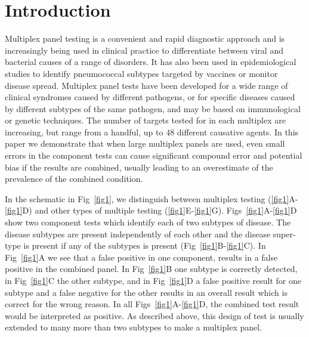 \documentclass[10pt,letterpaper]{article}
\begin{document}
\linenumbers

\section*{Introduction}

Multiplex panel testing is a convenient and rapid diagnostic approach and is increasingly being used in clinical practice to differentiate between viral and bacterial causes of a range of disorders\cite{ramanan2017}. It has also been used in epidemiological studies to identify pneumococcal subtypes targeted by vaccines\cite{bonten2015} or monitor disease spread\cite{henson2023}. Multiplex panel tests have been developed for a wide range of clinical syndromes caused by different pathogens, or for specific diseases caused by different subtypes of the same pathogen\cite{ramanan2017}, and may be based on immunological\cite{pride2012,kalina2020} or genetic techniques\cite{mengelle2013,murphy2020,jaaskelainen2006,jansen2011,grondahl1999,hendolin1997}. The number of targets tested for in each multiplex are increasing, but range from a handful, up to 48 different causative agents\cite{henson2023}. In this paper we demonstrate that when large multiplex panels are used, even small errors in the component tests can cause significant compound error and potential bias if the results are combined, usually leading to an overestimate of the prevalence of the combined condition.

In the schematic in Fig~\ref{fig1}, we distinguish between multiplex testing (\ref{fig1}A-\ref{fig1}D) and other types of multiple testing (\ref{fig1}E-\ref{fig1}G). Figs~\ref{fig1}A-\ref{fig1}D show two component tests which identify each of two subtypes of disease. The disease subtypes are present independently of each other and the disease super-type is present if any of the subtypes is present (Fig~\ref{fig1}B-\ref{fig1}C). In Fig~\ref{fig1}A we see that a false positive in one component, results in a false positive in the combined panel. In Fig~\ref{fig1}B one subtype is correctly detected, in Fig~\ref{fig1}C the other subtype, and in Fig~\ref{fig1}D a false positive result for one subtype and a false negative for the other results in an overall result which is correct for the wrong reason. In all Figs~\ref{fig1}A-\ref{fig1}D, the combined test result would be interpreted as positive. As described above, this design of test is usually extended to many more than two subtypes to make a multiplex panel.
\end{document}
